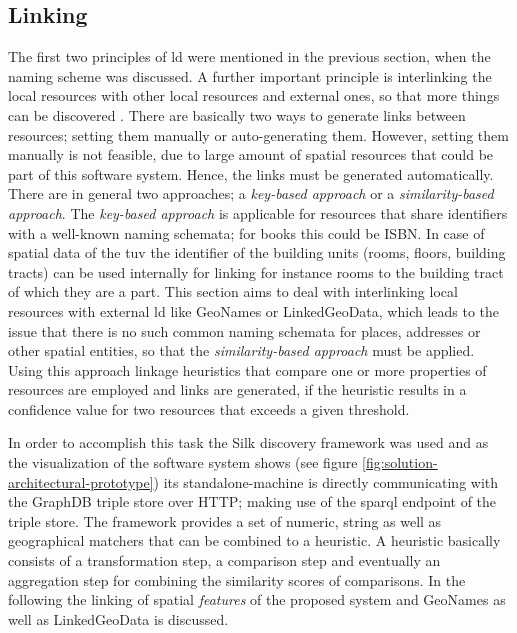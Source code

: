 \documentclass[draft,final]{vutinfth} %
\begin{document}
\subsection{Linking}
\label{solution-architectural-prototype:linking}
The first two principles of \gls{ld} were mentioned in the previous section, when the naming scheme was discussed. A further important principle is interlinking the local resources with other local resources and external ones, so that more things can be discovered \cite{berners-lee_linked_2009}. There are basically two ways to generate links between resources; setting them manually or auto-generating them. However, setting them manually is not feasible, due to large amount of spatial resources that could be part of this software system. Hence, the links must be generated automatically. There are in general two approaches; a \textit{key-based approach} or a \textit{similarity-based approach}\cite{heath_linked_2011}. The \textit{key-based approach} is applicable for resources that share identifiers with a well-known naming schemata; for books this could be ISBN. In case of spatial data of the \gls{tuv} the identifier of the building units (rooms, floors, building tracts) can be used internally for linking for instance rooms to the building tract of which they are a part. This section aims to deal with interlinking local resources with external \gls{ld} like GeoNames or LinkedGeoData, which leads to the issue that there is no such common naming schemata for places, addresses or other spatial entities, so that the \textit{similarity-based approach} must be applied. Using this approach linkage heuristics that compare one or more properties of resources are employed and links are generated, if the heuristic results in a confidence value for two resources that exceeds a given threshold.

In order to accomplish this task the Silk discovery framework\cite{volz_discovering_2009} was used and as the visualization of the software system shows (see figure \ref{fig:solution-architectural-prototype}) its standalone-machine is directly communicating with the GraphDB triple store over HTTP; making use of the \gls{sparql} endpoint of the triple store. The framework provides a set of numeric, string as well as geographical matchers that can be combined to a heuristic. A heuristic basically consists of a transformation step, a comparison step and eventually an aggregation step for combining the similarity scores of comparisons. In the following the linking of spatial \textit{features} of the proposed system and GeoNames as well as LinkedGeoData is discussed.
\end{document}
